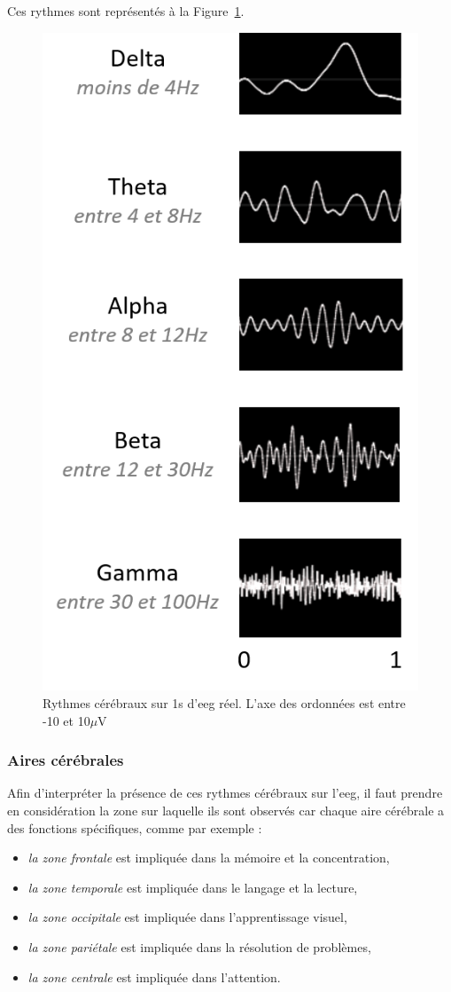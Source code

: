 Ces rythmes sont représentés à la Figure~\ref{Figure:introduction_EEG_waves}.

\begin{figure}[h!]
  \centering
	\includegraphics[width=0.5\linewidth]{figures/chapter-1/introduction-EEG-waves} 
  \caption{Rythmes cérébraux sur 1s d'\gls{eeg} réel. L'axe des ordonnées est entre -10 et 10$\mu$V }
  \label{Figure:introduction_EEG_waves}
\end{figure}

\subsubsection{Aires cérébrales}

Afin d'interpréter la présence de ces rythmes cérébraux sur l'\gls{eeg}, il faut prendre en considération la zone sur laquelle ils sont observés 
car chaque aire cérébrale a des fonctions spécifiques, comme par exemple \citep{Marzbani2016} :
\begin{itemize}
\item \emph{la zone frontale} est impliquée dans la mémoire et la concentration,
\item \emph{la zone temporale} est impliquée dans le langage et la lecture,
\item \emph{la zone occipitale }est impliquée dans l'apprentissage visuel,
\item \emph{la zone pariétale} est impliquée dans la résolution de problèmes,
\item \emph{la zone centrale} est impliquée dans l'attention.
\end{itemize}

